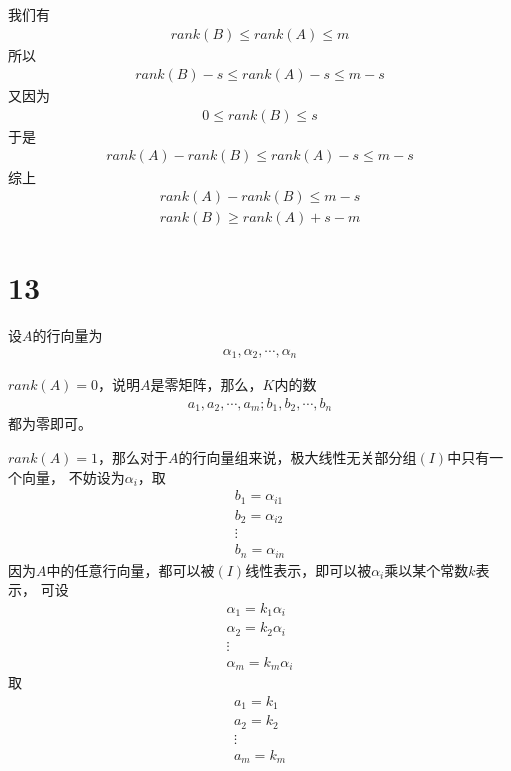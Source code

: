 \documentclass{article}
\begin{document}
我们有
\begin{align*}
  rank(B) \leq rank(A) \leq m
\end{align*}
所以
\begin{align*}
  rank(B) - s \leq rank(A) - s \leq m - s
\end{align*}
又因为
\begin{align*}
  0 \leq rank(B) \leq s
\end{align*}
于是
\begin{align*}
  rank(A) - rank(B) \leq rank(A) - s \leq m - s
\end{align*}
综上
\begin{align*}
  rank(A) - rank(B) \leq m - s \\
  rank(B) \geq rank(A) + s - m
\end{align*}

\section*{13}

设$A$的行向量为
\begin{align*}
  \alpha_1, \alpha_2, \cdots, \alpha_n
\end{align*}

$rank(A) = 0$，说明$A$是零矩阵，那么，$K$内的数
\begin{align*}
  a_1, a_2, \cdots, a_m; b_1, b_2, \cdots, b_n
\end{align*}
都为零即可。

$rank(A) = 1$，那么对于$A$的行向量组来说，极大线性无关部分组$(I)$中只有一个向量，
不妨设为$\alpha_i$，取
\begin{align*}
  b_1 = \alpha_{i1} \\
  b_2 = \alpha_{i2} \\
  \vdots            \\
  b_n = \alpha_{in}
\end{align*}
因为$A$中的任意行向量，都可以被$(I)$线性表示，即可以被$\alpha_i$乘以某个常数$k$表示，
可设
\begin{align*}
  \alpha_1 = k_1 \alpha_i \\
  \alpha_2 = k_2 \alpha_i \\
  \vdots                  \\
  \alpha_m = k_m \alpha_i
\end{align*}
取
\begin{align*}
  a_1 = k_1 \\
  a_2 = k_2 \\
  \vdots    \\
  a_m = k_m
\end{align*}
\end{document}
